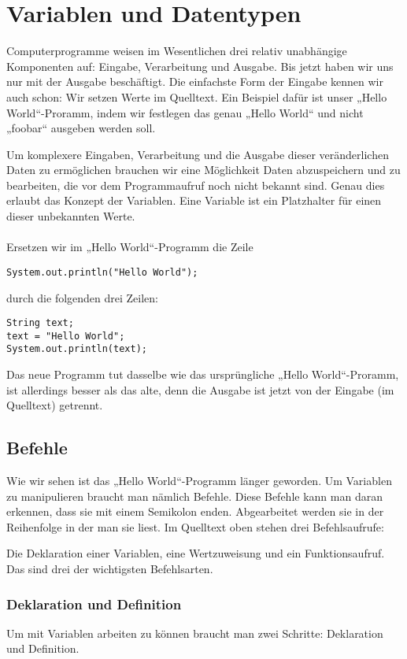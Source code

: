 \chapter{Variablen und Datentypen}
Computerprogramme weisen im Wesentlichen drei relativ unabhängige Komponenten auf: Eingabe, Verarbeitung und Ausgabe. Bis jetzt haben wir uns nur mit der Ausgabe beschäftigt.
Die einfachste Form der Eingabe kennen wir auch schon: Wir setzen Werte im Quelltext. Ein Beispiel dafür ist unser „Hello World“-Proramm, indem wir festlegen das genau „Hello World“ und nicht „foobar“ ausgeben werden soll.

Um komplexere Eingaben, Verarbeitung und die Ausgabe dieser veränderlichen Daten zu ermöglichen brauchen wir eine Möglichkeit Daten abzuspeichern und zu bearbeiten, die vor dem Programmaufruf noch nicht bekannt sind.
Genau dies erlaubt das Konzept der Variablen. Eine Variable ist ein Platzhalter für einen dieser unbekannten Werte. \\ \\
Ersetzen wir im „Hello World“-Programm die Zeile
\begin{lstlisting}
System.out.println("Hello World");
\end{lstlisting}
durch die folgenden drei Zeilen:
\begin{lstlisting}
String text;
text = "Hello World";
System.out.println(text);
\end{lstlisting}

Das neue Programm tut dasselbe wie das ursprüngliche „Hello World“-Proramm, ist allerdings besser als das alte, denn die Ausgabe ist jetzt von der Eingabe (im Quelltext) getrennt.

\section {Befehle}
Wie wir sehen ist das „Hello World“-Programm länger geworden. Um Variablen zu manipulieren braucht man nämlich Befehle. Diese Befehle kann man daran erkennen, dass sie mit einem Semikolon enden. Abgearbeitet werden sie in der Reihenfolge in der man sie liest. Im Quelltext oben stehen drei Befehlsaufrufe:

Die Deklaration einer Variablen, eine Wertzuweisung und ein Funktionsaufruf. Das sind drei der wichtigsten Befehlsarten.

\subsection {Deklaration und Definition}
Um mit Variablen arbeiten zu können braucht man zwei Schritte: Deklaration und Definition.

